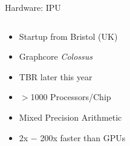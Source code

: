 \begin{slide}{Hardware: IPU}
  \begin{columns}
    \begin{column}{0.5\textwidth}
        \begin{itemize}
          \item Startup from Bristol (UK)
          \item Graphcore \textit{Colossus}
          \item TBR later this year
          \item $>$1000 Processors/Chip
          \item Mixed Precision Arithmetic
          \item 2x $-$ 200x faster than GPUs
        \end{itemize}
    \end{column}
    \begin{column}{0.5\textwidth}
      \centering
    \end{column}
  \end{columns}
\end{slide}
